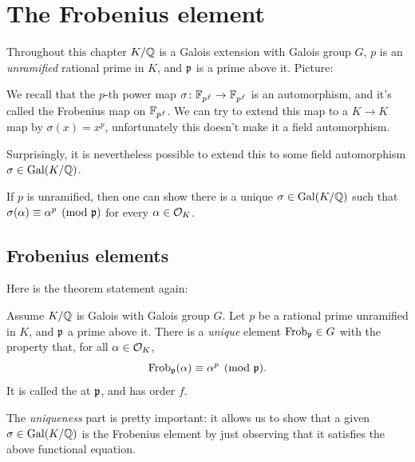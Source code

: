 \chapter{The Frobenius element}
\label{ch:frobenius-element}
Throughout this chapter $K/\mathbb Q$ is a Galois extension with Galois group $G$,
$p$ is an \emph{unramified} rational prime in $K$, and $\mathfrak p$ is a prime above it.
Picture:
\begin{center}
\end{center}

We recall that the $p$-th power map $\sigma \colon \mathbb F_{p^f} \to \mathbb F_{p^f}$ is an automorphism, and it's called the Frobenius map on $\mathbb F_{p^f}$.
We can try to extend this map to a $K \to K$ map by $\sigma(x) = x^p$, unfortunately this doesn't make it a field automorphism.

Surprisingly, it is nevertheless possible to extend this to some field automorphism $\sigma \in \operatorname{Gal}(K/\mathbb Q)$.

If $p$ is unramified, then one can show there
is a unique $\sigma \in \operatorname{Gal}(K/\mathbb Q)$ such that
$\sigma(\alpha) \equiv \alpha^p \pmod{\mathfrak p}$ for every $\alpha \in \mathcal O_K$.

\section{Frobenius elements}

Here is the theorem statement again:
\begin{theorem}
	Assume $K/\mathbb Q$ is Galois with Galois group $G$.
	Let $p$ be a rational prime unramified in $K$, and $\mathfrak p$ a prime above it.
	There is a \emph{unique} element $\mathrm{Frob}_\mathfrak p \in G$
	with the property that, for all $\alpha \in \mathcal O_K$,
	\[ \mathrm{Frob}_\mathfrak p(\alpha) \equiv \alpha^{p} \pmod{\mathfrak p}. \]
	It is called the  at $\mathfrak p$, and has order $f$.
\end{theorem}
The \emph{uniqueness} part is pretty important:
it allows us to show that a given $\sigma \in \operatorname{Gal}(K/\mathbb Q)$
is the Frobenius element by just observing that it satisfies
the above functional equation.

